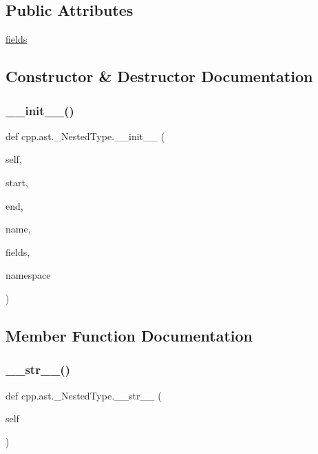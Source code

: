 \subsection*{Public Attributes}
\begin{DoxyCompactItemize}
\item 
\mbox{\hyperlink{classcpp_1_1ast_1_1__NestedType_aed69c37a409b4d26e6cfde2de3185d86}{fields}}
\end{DoxyCompactItemize}


\subsection{Constructor \& Destructor Documentation}
\mbox{\label{classcpp_1_1ast_1_1__NestedType_a63acff60f38885be6cc11231fffc3f4e}} 
\subsubsection{\texorpdfstring{\_\_init\_\_()}{\_\_init\_\_()}}
{\footnotesize\ttfamily def cpp.\+ast.\+\_\+\+Nested\+Type.\+\_\+\+\_\+init\+\_\+\+\_\+ (\begin{DoxyParamCaption}\item[{}]{self,  }\item[{}]{start,  }\item[{}]{end,  }\item[{}]{name,  }\item[{}]{fields,  }\item[{}]{namespace }\end{DoxyParamCaption})}



\subsection{Member Function Documentation}
\mbox{\label{classcpp_1_1ast_1_1__NestedType_a18901ec6acba88c526d703444bf4d52c}} 
\subsubsection{\texorpdfstring{\_\_str\_\_()}{\_\_str\_\_()}}
{\footnotesize\ttfamily def cpp.\+ast.\+\_\+\+Nested\+Type.\+\_\+\+\_\+str\+\_\+\+\_\+ (\begin{DoxyParamCaption}\item[{}]{self }\end{DoxyParamCaption})}

